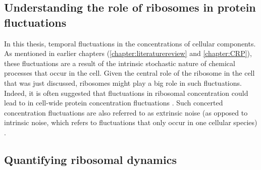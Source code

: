 \subsection{Understanding the role of ribosomes in protein fluctuations}

In this thesis, 
temporal fluctuations in the concentrations of cellular components.%
%
As mentioned in earlier chapters (\ref{chapter:literaturereview} and  \ref{chapter:CRP}),
these fluctuations are a result of the intrinsic stochastic nature of chemical processes that occur in the cell.
%
Given the central role of the ribosome in the cell that was just discussed, ribosomes might play a big role in such fluctuations.
Indeed, it is often suggested that fluctuations in ribosomal concentration could lead to in cell-wide protein concentration fluctuations \cite{Davidson2008, Raj2008, Chalancon2012, Bruggeman2018}.
%
Such concerted concentration fluctuations are also referred to as extrinsic noise (as opposed to intrinsic noise, which refers to fluctuations that only occur in one cellular species) \cite{Elowitz2002}.

\subsection{Quantifying ribosomal dynamics}
\label{section:ribos:walker}

